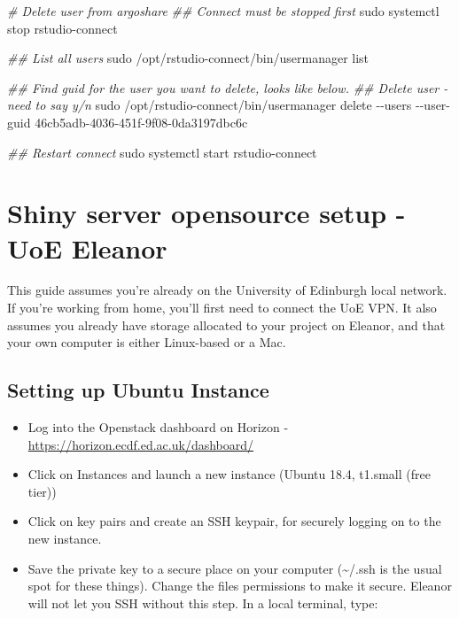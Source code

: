 \documentclass[
]{book}
\newenvironment{Shaded}{\begin{snugshade}}{\end{snugshade}}
\newcommand{\AttributeTok}[1]{\textcolor[rgb]{0.77,0.63,0.00}{#1}}
\newcommand{\CommentTok}[1]{\textcolor[rgb]{0.56,0.35,0.01}{\textit{#1}}}
\newcommand{\FunctionTok}[1]{\textcolor[rgb]{0.00,0.00,0.00}{#1}}
\newcommand{\NormalTok}[1]{#1}
\providecommand{\tightlist}{%
  \setlength{\itemsep}{0pt}\setlength{\parskip}{0pt}}
\begin{document}
\begin{Shaded}
\begin{Highlighting}[]
\CommentTok{\# Delete user from argoshare}
\CommentTok{\#\# Connect must be stopped first}
\FunctionTok{sudo}\NormalTok{ systemctl stop rstudio{-}connect}

\CommentTok{\#\# List all users}
\FunctionTok{sudo}\NormalTok{ /opt/rstudio{-}connect/bin/usermanager list}

\CommentTok{\#\# Find guid for the user you want to delete, looks like below. }
\CommentTok{\#\# Delete user {-} need to say y/n}
\FunctionTok{sudo}\NormalTok{ /opt/rstudio{-}connect/bin/usermanager delete }\AttributeTok{{-}{-}users} \AttributeTok{{-}{-}user{-}guid}\NormalTok{ 46cb5adb{-}4036{-}451f{-}9f08{-}0da3197dbc6c}

\CommentTok{\#\# Restart connect}
\FunctionTok{sudo}\NormalTok{ systemctl start rstudio{-}connect}
\end{Highlighting}
\end{Shaded}

\hypertarget{shiny-server-opensource-setup---uoe-eleanor}{%
\section{Shiny server opensource setup - UoE Eleanor}\label{shiny-server-opensource-setup---uoe-eleanor}}

This guide assumes you're already on the University of Edinburgh local network. If you're working from home, you'll first need to connect the UoE VPN. It also assumes you already have storage allocated to your project on Eleanor, and that your own computer is either Linux-based or a Mac.

\hypertarget{setting-up-ubuntu-instance}{%
\subsection{Setting up Ubuntu Instance}\label{setting-up-ubuntu-instance}}

\begin{itemize}
\tightlist
\item
  Log into the Openstack dashboard on Horizon - \url{https://horizon.ecdf.ed.ac.uk/dashboard/}
\item
  Click on Instances and launch a new instance (Ubuntu 18.4, t1.small (free tier))
\item
  Click on key pairs and create an SSH keypair, for securely logging on to the new instance.
\item
  Save the private key to a secure place on your computer (\textasciitilde/.ssh is the usual spot for these things). Change the files permissions to make it secure. Eleanor will not let you SSH without this step. In a local terminal, type:
\end{itemize}
\end{document}
